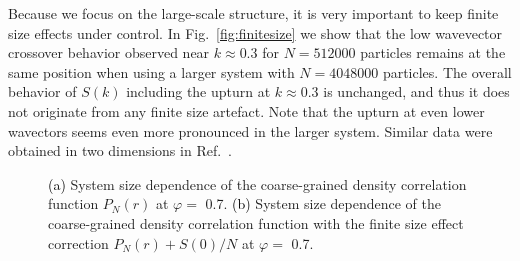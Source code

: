 \documentclass[aps,pre,twocolumn,superscriptaddress]{revtex4-1}
\renewcommand{\phi}{\varphi}
\newcommand{\red}[1]{\textcolor{black}{#1}}
\begin{document}
Because we focus on the large-scale structure, 
it is very important to keep finite size effects under control. 
In Fig.~\ref{fig:finitesize} we show that the low wavevector 
crossover behavior observed near $k \approx 0.3$ for 
$N = 512000$ particles remains at the same position 
when using a larger system with $N = 4048000$ particles. 
The overall behavior of $S(k)$ including the upturn at $k \approx 0.3$
is unchanged, and thus it does not originate 
from any finite size artefact.
Note that the upturn at even lower wavectors seems even more pronounced 
in the larger system.
Similar data were obtained in two dimensions in Ref.~\cite{wu2015}.

\begin{figure}
\begin{center}
\caption{\red{(a)} System size dependence of the coarse-grained 
density correlation function $P_N(r)$ at $\phi =$ 0.7. 
\red{(b)} System size dependence of the coarse-grained density 
correlation function 
with the finite size effect correction $P_N(r) + S(0)/N$ at $\phi =$ 0.7.
} 
\label{fig:finite}
\end{center}
\end{figure}
\end{document}
